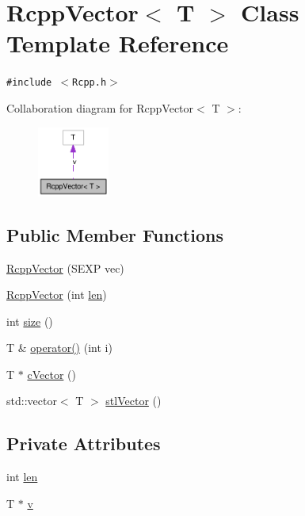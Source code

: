 \hypertarget{classRcppVector}{
\section{RcppVector$<$ T $>$ Class Template Reference}
\label{classRcppVector}
}
{\tt \#include $<$Rcpp.h$>$}

Collaboration diagram for RcppVector$<$ T $>$:\nopagebreak
\begin{figure}[H]
\begin{center}
\leavevmode
\includegraphics[width=67pt]{classRcppVector__coll__graph}
\end{center}
\end{figure}
\subsection*{Public Member Functions}
\begin{CompactItemize}
\item 
\hyperlink{classRcppVector_0925b350f636a546e58ad0329786500a}{RcppVector} (SEXP vec)
\item 
\hyperlink{classRcppVector_eb7797ca2b2ac2d03fee0a543993f17b}{RcppVector} (int \hyperlink{classRcppVector_733f5ed23ade0723338904f9f08457d6}{len})
\item 
int \hyperlink{classRcppVector_1e2424dc9b91014ba8b2c9351d97eb37}{size} ()
\item 
T \& \hyperlink{classRcppVector_66aca1da0563af28e55768d98488a42d}{operator()} (int i)
\item 
T $\ast$ \hyperlink{classRcppVector_f4660a27a888a51693b02d2f51b47b08}{cVector} ()
\item 
std::vector$<$ T $>$ \hyperlink{classRcppVector_c650f89b966962b167f3bc42aecf213b}{stlVector} ()
\end{CompactItemize}
\subsection*{Private Attributes}
\begin{CompactItemize}
\item 
int \hyperlink{classRcppVector_733f5ed23ade0723338904f9f08457d6}{len}
\item 
T $\ast$ \hyperlink{classRcppVector_c810c53db4c1b978bada104b38484b26}{v}
\end{CompactItemize}



